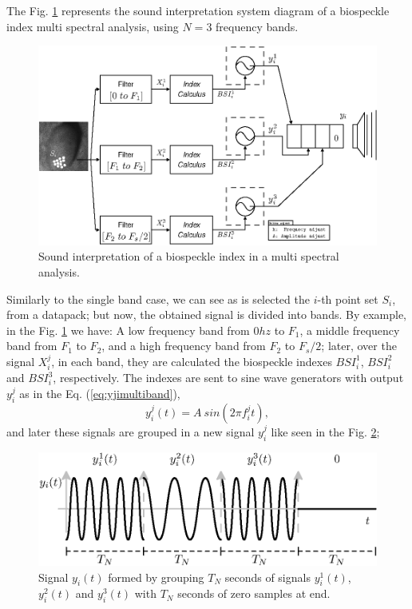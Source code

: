 \documentclass[review]{elsarticle}
\begin{document}
The Fig. \ref{fig:Diagrama1} represents the sound interpretation system diagram of a
biospeckle index multi spectral analysis, using $N=3$ frequency bands.
\begin{figure}[ht!]
\centering
\includegraphics[width=0.99\columnwidth]{Diagrama1.eps}
\caption{Sound interpretation of a biospeckle index in a multi spectral analysis.}
\label{fig:Diagrama1}
\end{figure}
Similarly to the single band case, we can see as is selected the $i$-th point set $S_i$, from a datapack;
but now, the obtained signal is divided into bands. By example, in the Fig. \ref{fig:Diagrama1}
we have: A low frequency band from $0hz$ to $F_1$,
a middle frequency band from $F_1$ to $F_2$, and a high frequency band from $F_2$ to $F_s/2$;
later, over the signal $X_i^j$, in each band, they are calculated the biospeckle indexes 
$BSI^1_i$, $BSI^2_i$ and $BSI^3_i$, respectively. The indexes are sent to
sine wave generators with output $y^j_i$ as in the Eq. (\ref{eq:yjimultiband}),
\begin{equation}\label{eq:yjimultiband}
 y^j_i(t)= A~sin \left(2 \pi  f^j_{i} t \right),
\end{equation}
and later these signals are grouped in a new signal $y^j_i$ like seen in the Fig. \ref{fig:Diagrama2};
\begin{figure}[ht!]
\centering
\includegraphics[width=1.0\columnwidth]{Diagrama2.eps}
\caption{Signal $y_i(t)$ formed by grouping $T_N$ seconds of signals $y^1_i(t)$, $y^2_i(t)$ and $y^3_i(t)$ with $T_N$ seconds of zero samples at end.}
\label{fig:Diagrama2}
\end{figure}
\end{document}
